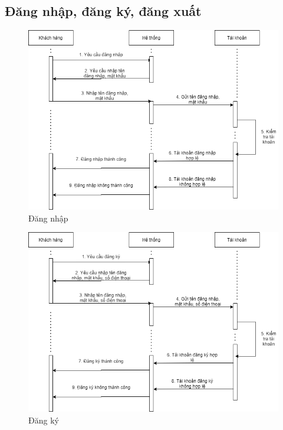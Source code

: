 \subsection{Đăng nhập, đăng ký, đăng xuất}

\begin{figure}[!h]
    \begin{center}
        \includegraphics[scale=0.6]{Images/SequenceDiagram/s_login.drawio.png}
    \end{center}
    \hspace{0.3cm}
    \caption{Đăng nhập}
\end{figure}

\newpage

\begin{figure}[!h]
    \begin{center}
        \includegraphics[scale=0.6]{Images/SequenceDiagram/s_register.drawio.png}
    \end{center}
    \hspace{0.3cm}
    \caption{Đăng ký}
\end{figure}

